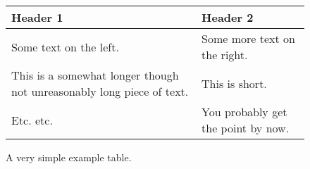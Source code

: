 
\usepackage{booktabs}



\begingroup %
\setlength{\tabcolsep}{9pt} %
\renewcommand{\arraystretch}{1.5} %
\begin{figure}
\begin{tabular}{p{} p{}} \toprule
	\textbf{Header 1} & \textbf{Header 2} \\
	\midrule
	Some text on the left. & Some more text on the right. \\
	This is a somewhat longer though not unreasonably long piece of text. & This is short. \\
	Etc. etc. & You probably get the point by now. \\
		\bottomrule
\end{tabular}
\caption{A very simple example table.}
\label{fig:table}
\end{figure}
\endgroup

